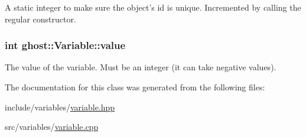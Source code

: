 A static integer to make sure the object's id is unique. Incremented by calling the regular constructor. 

\hypertarget{classghost_1_1Variable_a4623be8dd7ed2a0cb7033aec42033cb7}{
\subsubsection[{value}]{\setlength{\rightskip}{0pt plus 5cm}int ghost\-::\-Variable\-::value\hspace{0.3cm}{\ttfamily [protected]}}}\label{classghost_1_1Variable_a4623be8dd7ed2a0cb7033aec42033cb7}


The value of the variable. Must be an integer (it can take negative values). 



The documentation for this class was generated from the following files\-:\begin{DoxyCompactItemize}
\item 
include/variables/\hyperlink{variable_8hpp}{variable.\-hpp}\item 
src/variables/\hyperlink{variable_8cpp}{variable.\-cpp}\end{DoxyCompactItemize}
